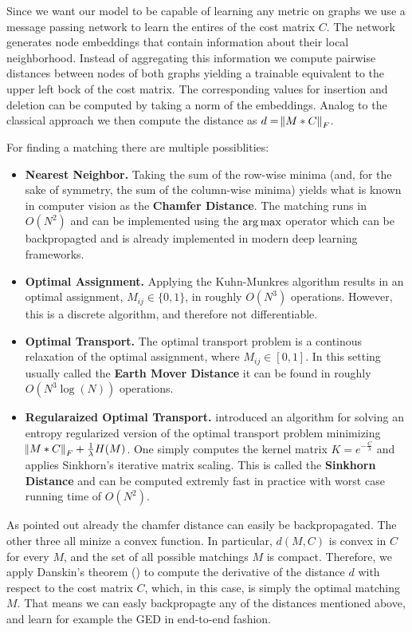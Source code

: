 Since we want our model to be capable of learning any metric on graphs we use a message passing network to learn the entires of the cost matrix $C$. The network generates node embeddings that contain information about their local neighborhood. Instead of aggregating this information we compute pairwise distances between nodes of both graphs yielding a trainable equivalent to the upper left bock of the cost matrix. The corresponding values for insertion and deletion can be computed by taking a norm of the embeddings. Analog to the classical approach we then compute the distance as $ d = \norm{M * C}_F $.

For finding a matching there are multiple possiblities:
\begin{itemize}
     \item \textbf{Nearest Neighbor.} Taking the sum of the row-wise minima (and, for the sake of symmetry, the sum of the column-wise minima) yields what is known in computer vision as the \textbf{Chamfer Distance}. The matching runs in $O(N^2)$ and can be implemented using the $\operatorname*{arg\,max}$ operator which can be backpropagted and is already implemented in modern deep learning frameworks.
     \item \textbf{Optimal Assignment.} Applying the Kuhn-Munkres algorithm results in an optimal assignment, $M_{ij} \in \{0,1\}$, in roughly $O(N^3)$ operations. However, this is a discrete algorithm, and therefore not differentiable.
     \item \textbf{Optimal Transport.} The optimal transport problem is a continous relaxation of the optimal assignment, where $M_{ij} \in \left[ 0,1 \right]$. In this setting usually called the \textbf{Earth Mover Distance} it can be found in roughly $O(N^3 \log(N))$ operations.
     \item \textbf{Regularaized Optimal Transport.} \cite{sinkhorn2013} introduced an algorithm for solving an entropy regularized version of the optimal transport problem minimizing $\norm{M * C}_F + \frac{1}{\lambda} H(M)$. One simply computes the kernel matrix $ K = e^{ -\frac{C}{\lambda}}$ and applies Sinkhorn’s iterative matrix scaling. This is called the \textbf{Sinkhorn Distance} and can be computed extremly fast in practice with worst case running time of $O(N^2)$.
\end{itemize}
As pointed out already the chamfer distance can easily be backpropagated. The other three all minize a convex function. In particular, $d(M,C)$ is convex in $C$ for every $M$, and the set of all possible matchings $M$ is compact. Therefore, we apply Danskin's theorem (\citealp{danskin1967}) to compute the derivative of the distance $d$ with respect to the cost matrix $C$, which, in this case, is simply the optimal matching $M$. That means we can easly backpropagte any of the distances mentioned above, and learn for example the GED in end-to-end fashion.

